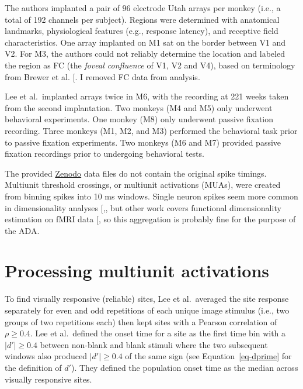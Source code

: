 \documentclass[
  11pt,
  letterpaper,
  DIV=11,
  numbers=noendperiod]{scrartcl}
\begin{document}
The authors implanted a pair of 96 electrode Utah arrays per monkey
(i.e., a total of 192 channels per subject). Regions were determined
with anatomical landmarks, physiological features (e.g., response
latency), and receptive field characteristics. One array implanted on M1
sat on the border between V1 and V2. For M3, the authors could not
reliably determine the location and labeled the region as FC (the
\emph{foveal confluence} of V1, V2 and V4), based on terminology from
Brewer et al. {[}\citeproc{ref-brewer_visual_2002}{9}{]}. I removed FC
data from analysis.

Lee et al.~implanted arrays twice in M6, with the recording at 221 weeks
taken from the second implantation. Two monkeys (M4 and M5) only
underwent behavioral experiments. One monkey (M8) only underwent passive
fixation recording. Three monkeys (M1, M2, and M3) performed the
behavioral task prior to passive fixation experiments. Two monkeys (M6
and M7) provided passive fixation recordings prior to undergoing
behavioral tests.

The provided \href{https://zenodo.org/records/10888270}{Zenodo} data
files do not contain the original spike timings. Multiunit threshold
crossings, or multiunit activations (MUAs), were created from binning
spikes into 10 ms windows. Single neuron spikes seem more common in
dimensionality analyses
{[},\citeproc{ref-cowley_stimulus-driven_2016}{11}{]},
but other work covers functional dimensionality estimation on fMRI data
{[}\citeproc{ref-ahlheim_estimating_2018}{12}{]}, so this aggregation is
probably fine for the purpose of the ADA.

\section{Processing multiunit activations}\label{sec-processing}

To find visually responsive (reliable) sites, Lee et al.~averaged the
site response separately for even and odd repetitions of each unique
image stimulus (i.e., two groups of two repetitions each) then kept
sites with a Pearson correlation of \(\rho \geq 0.4\). Lee et
al.~defined the onset time for a site as the first time bin with a
\(|d'| \geq 0.4\) between non-blank and blank stimuli where the two
subsequent windows also produced \(|d'| \geq 0.4\) of the same sign (see
Equation~\ref{eq-dprime} for the definition of \(d'\)). They defined the
population onset time as the median across visually responsive sites.
\end{document}
